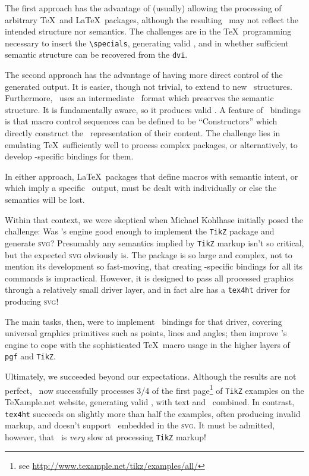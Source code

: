 \documentclass{llncs}
\def\svg{\textsc{svg}\xspace}
\def\tikz{\texttt{TikZ}\xspace}
\begin{document}
The first approach has the advantage of (usually)
allowing the processing of arbitrary \TeX\ and \LaTeX\ packages,
although the resulting \HTML\ may not reflect the intended
structure nor semantics.
The challenges are in the \TeX\ programming necessary to
insert the \verb|\specials|, generating valid \HTML,
and in whether sufficient semantic structure can be
recovered from the \texttt{dvi}.

The second approach has the advantage of having more
direct control of the generated output.
It is easier, though not trivial, to extend to new
\XML\ structures.  Furthermore, \LaTeXML\
uses an intermediate \XML\ format which preserves
the semantic structure. It is fundamentally {\XML} aware, so it produces valid \XML.
A feature of \LaTeXML\ bindings is that macro
control sequences can be defined to be ``Constructors''
which directly construct the \XML\ representation
of their content.
The challenge lies in emulating \TeX\ sufficiently well to
process complex packages, or alternatively, to
develop \LaTeXML-specific bindings for them.

In either approach, \LaTeX\ packages that define
macros with semantic intent, or which imply a specific \XML\
output, must be dealt with
individually or else the semantics will be lost.

Within that context, we were skeptical when Michael Kohlhase
initially posed the challenge: Was \LaTeXML's engine good
enough to implement the \tikz package and generate \svg?
Presumably any semantics implied by \tikz markup isn't so critical,
but the expected \svg obviously is.
The package is so large and complex, not to mention
its development so fast-moving, that creating \LaTeXML-specific
bindings for all its commands is impractical.  However,
it is designed to pass all processed graphics through
a relatively small driver layer, and in fact alre has a \texttt{tex4ht} driver for producing \svg!

The main tasks, then, were to implement \LaTeXML\ bindings
for that driver, covering universal graphics primitives such as points, lines and angles;
then improve \LaTeXML's engine to cope
with the sophisticated \TeX\ macro usage in the higher
layers of \texttt{pgf} and \tikz.

Ultimately, we succeeded beyond our expectations.
Although the results are not perfect,
\LaTeXML\ now successfully processes 3/4 of the
first page\footnote{see \url{http://www.texample.net/tikz/examples/all/}} of \tikz examples on the
{\TeX}ample.net website, generating valid
\HTML5, with text and \MathML\ combined.
In contrast, \texttt{tex4ht} succeeds on slightly more
than half the examples, often producing invalid markup,
and doesn't support \MathML\ embedded in the \svg.
It must be admitted, however, that \LaTeXML\ is \emph{very}
slow at processing \tikz markup!
\end{document}
